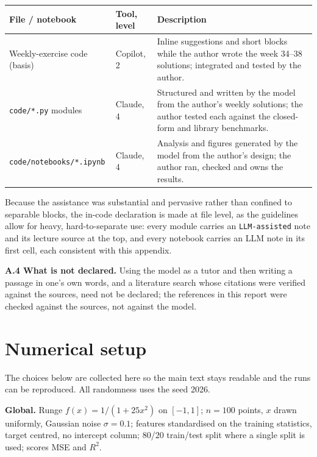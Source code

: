 \documentclass[a4paper,11pt]{article}
\begin{document}
\begin{center}
\begin{tabular}{llp{8.2cm}}
\toprule
File / notebook & Tool, level & Description \\
\midrule
Weekly-exercise code (basis) & Copilot, 2 & Inline suggestions and short blocks while the author wrote the week 34--38 solutions; integrated and tested by the author. \\
\texttt{code/*.py} modules & Claude, 4 & Structured and written by the model from the author's weekly solutions; the author tested each against the closed-form and library benchmarks. \\
\texttt{code/notebooks/*.ipynb} & Claude, 4 & Analysis and figures generated by the model from the author's design; the author ran, checked and owns the results. \\
\bottomrule
\end{tabular}
\end{center}

Because the assistance was substantial and pervasive rather than confined to
separable blocks, the in-code declaration is made at file level, as the
guidelines allow for heavy, hard-to-separate use: every module carries an
\texttt{LLM-assisted} note and its lecture source at the top, and every notebook
carries an LLM note in its first cell, each consistent with this appendix.

\noindent\textbf{A.4 What is not declared.} Using the model as a tutor and then
writing a passage in one's own words, and a literature search whose citations
were verified against the sources, need not be declared; the references in this
report were checked against the sources, not against the model.

\section{Numerical setup}
The choices below are collected here so the main text stays readable and the runs
can be reproduced. All randomness uses the seed 2026.

\noindent\textbf{Global.} Runge $f(x)=1/(1+25x^2)$ on $[-1,1]$; $n=100$ points,
$x$ drawn uniformly, Gaussian noise $\sigma=0.1$; features standardised on the
training statistics, target centred, no intercept column; 80/20 train/test split
where a single split is used; scores MSE and $R^2$.
\end{document}
